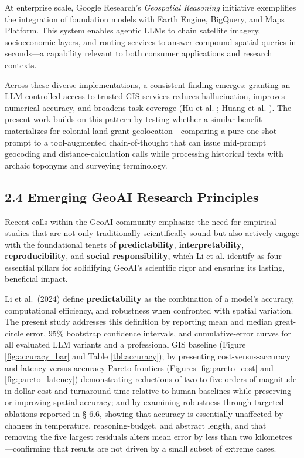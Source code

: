 At enterprise scale, Google Research's \emph{Geospatial Reasoning}
initiative \citep{GoogleResearch2025_geospatial} exemplifies the
integration of foundation models with Earth Engine, BigQuery, and Maps
Platform. This system enables agentic LLMs to chain satellite imagery,
socioeconomic layers, and routing services to answer compound spatial
queries in seconds---a capability relevant to both consumer applications
and research contexts.

Across these diverse implementations, a consistent finding emerges:
granting an LLM controlled access to trusted GIS services reduces
hallucination, improves numerical accuracy, and broadens task coverage
(Hu et al. \citep{Hu2024_toponym_llm}; Huang et al.
\citep{Huang2024_geoagent}). The present work builds on this pattern by
testing whether a similar benefit materializes for colonial land-grant
geolocation---comparing a pure one-shot prompt to a tool-augmented
chain-of-thought that can issue mid-prompt geocoding and
distance-calculation calls while processing historical texts with
archaic toponyms and surveying terminology.

\subsection{2.4 Emerging GeoAI Research
Principles}\label{emerging-geoai-research-principles}

Recent calls within the GeoAI community emphasize the need for empirical
studies that are not only traditionally scientifically sound but also
actively engage with the foundational tenets of \textbf{predictability},
\textbf{interpretability}, \textbf{reproducibility}, and \textbf{social
responsibility}, which Li et al. \citep{Li2024_geoai} identify as four
essential pillars for solidifying GeoAI's scientific rigor and ensuring
its lasting, beneficial impact.

Li et al.~(2024) define \textbf{predictability} as the combination of a
model's accuracy, computational efficiency, and robustness when
confronted with spatial variation. The present study addresses this
definition by reporting mean and median great-circle error, 95\%
bootstrap confidence intervals, and cumulative-error curves for all
evaluated LLM variants and a professional GIS baseline (Figure
\ref{fig:accuracy_bar} and Table \ref{tbl:accuracy}); by presenting
cost-versus-accuracy and latency-versus-accuracy Pareto frontiers
(Figures \ref{fig:pareto_cost} and \ref{fig:pareto_latency})
demonstrating reductions of two to five orders-of-magnitude in dollar
cost and turnaround time relative to human baselines while preserving or
improving spatial accuracy; and by examining robustness through targeted
ablations reported in § 6.6, showing that accuracy is essentially
unaffected by changes in temperature, reasoning-budget, and abstract
length, and that removing the five largest residuals alters mean error
by less than two kilometres---confirming that results are not driven by
a small subset of extreme cases.

